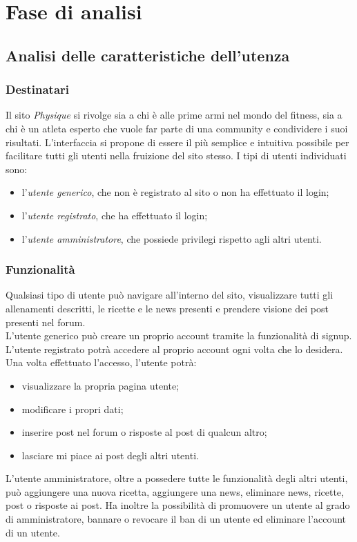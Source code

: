 \section{Fase di analisi}
\subsection{Analisi delle caratteristiche dell'utenza}
\label{sub:analisi_delle_caratteristiche_dell_utenza}
\subsubsection{Destinatari}
\label{subs:destinatari}
Il sito \emph{Physique} si rivolge sia a chi è alle prime armi nel mondo del fitness, sia a chi è un atleta esperto che vuole far parte di una community e condividere i suoi risultati. 
L'interfaccia si propone di essere il più semplice e intuitiva possibile per facilitare tutti gli utenti nella fruizione del sito stesso. I tipi di utenti individuati sono:
\begin{itemize}
    \item l'\textit{utente generico}, che non è registrato al sito o non ha effettuato il login;
    \item l'\textit{utente registrato}, che ha effettuato il login;
    \item l'\textit{utente amministratore}, che possiede privilegi rispetto agli altri utenti.
\end{itemize}

\subsubsection{Funzionalità}
\label{subs:funzionalità}
Qualsiasi tipo di utente può navigare all'interno del sito, visualizzare tutti gli allenamenti descritti, le ricette e le news presenti e prendere visione dei post presenti nel forum.\\
L'utente generico può creare un proprio account tramite la funzionalità di signup. L'utente registrato potrà accedere al proprio account ogni volta che lo desidera. Una volta effettuato l'accesso, l'utente potrà:
\begin{itemize}
    \item visualizzare la propria pagina utente;
    \item modificare i propri dati;
    \item inserire post nel forum o risposte al post di qualcun altro;
    \item lasciare mi piace ai post degli altri utenti.
\end{itemize}
L'utente amministratore, oltre a possedere tutte le funzionalità degli altri utenti, 
può aggiungere una nuova ricetta, 
aggiungere una news, eliminare news, ricette, post o risposte ai post. Ha inoltre la possibilità di promuovere un utente al grado di amministratore, bannare o revocare il ban di un utente ed eliminare l'account di un utente.
